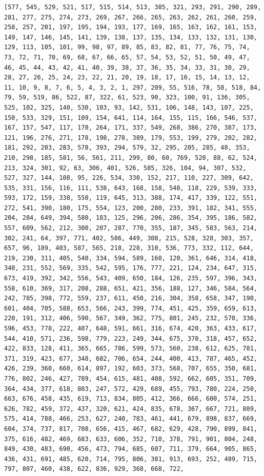 \documentclass{report}
\begin{document}
\begin{lstlisting}
[577, 545, 529, 521, 517, 515, 514, 513, 385, 321, 293, 291, 290, 289, 281, 277, 275, 274, 273, 269, 267, 266, 265, 263, 262, 261, 260, 259, 258, 257, 201, 197, 195, 194, 193, 177, 169, 165, 163, 162, 161, 153, 149, 147, 146, 145, 141, 139, 138, 137, 135, 134, 133, 132, 131, 130, 129, 113, 105, 101, 99, 98, 97, 89, 85, 83, 82, 81, 77, 76, 75, 74, 73, 72, 71, 70, 69, 68, 67, 66, 65, 57, 54, 53, 52, 51, 50, 49, 47, 46, 45, 44, 43, 42, 41, 40, 39, 38, 37, 36, 35, 34, 33, 31, 30, 29, 28, 27, 26, 25, 24, 23, 22, 21, 20, 19, 18, 17, 16, 15, 14, 13, 12, 11, 10, 9, 8, 7, 6, 5, 4, 3, 2, 1, 297, 209, 55, 516, 78, 58, 518, 84, 79, 59, 519, 86, 522, 87, 322, 61, 523, 90, 323, 100, 91, 136, 305, 525, 102, 325, 140, 530, 103, 93, 142, 531, 106, 148, 143, 107, 225, 150, 533, 329, 151, 109, 154, 641, 114, 164, 155, 115, 166, 546, 537, 167, 157, 547, 117, 170, 264, 171, 337, 549, 268, 386, 270, 387, 173, 121, 196, 276, 271, 178, 198, 278, 389, 179, 553, 199, 279, 202, 282, 181, 292, 203, 283, 578, 393, 294, 579, 32, 295, 205, 285, 48, 353, 210, 298, 185, 581, 56, 561, 211, 299, 80, 60, 769, 520, 88, 62, 524, 213, 324, 301, 92, 63, 306, 401, 526, 585, 326, 104, 94, 307, 532, 527, 327, 144, 108, 95, 226, 534, 330, 152, 217, 110, 227, 309, 642, 535, 331, 156, 116, 111, 538, 643, 168, 158, 548, 118, 229, 539, 333, 593, 172, 159, 338, 550, 119, 645, 313, 388, 174, 417, 339, 122, 551, 272, 541, 390, 180, 175, 554, 123, 200, 280, 233, 391, 182, 341, 555, 204, 284, 649, 394, 580, 183, 125, 296, 206, 286, 354, 395, 186, 582, 557, 609, 562, 212, 300, 207, 287, 770, 355, 187, 345, 583, 563, 214, 302, 241, 64, 397, 771, 402, 586, 449, 308, 215, 528, 328, 303, 357, 657, 96, 189, 403, 587, 565, 218, 228, 310, 536, 773, 332, 112, 644, 219, 230, 311, 405, 540, 334, 594, 589, 160, 120, 361, 646, 314, 418, 340, 231, 552, 569, 335, 542, 595, 176, 777, 221, 124, 234, 647, 315, 673, 419, 392, 342, 556, 543, 409, 650, 184, 126, 235, 597, 396, 343, 558, 610, 369, 317, 208, 288, 651, 421, 356, 188, 127, 346, 584, 564, 242, 785, 398, 772, 559, 237, 611, 450, 216, 304, 358, 658, 347, 190, 601, 404, 705, 588, 653, 566, 243, 399, 774, 451, 425, 359, 659, 613, 220, 191, 312, 406, 590, 567, 349, 362, 775, 801, 245, 232, 570, 336, 596, 453, 778, 222, 407, 648, 591, 661, 316, 674, 420, 363, 433, 617, 544, 410, 571, 236, 598, 779, 223, 249, 344, 675, 370, 318, 457, 652, 422, 833, 128, 411, 365, 665, 786, 599, 573, 560, 238, 612, 625, 781, 371, 319, 423, 677, 348, 602, 706, 654, 244, 400, 413, 787, 465, 452, 426, 239, 360, 660, 614, 897, 192, 603, 373, 568, 707, 655, 350, 681, 776, 802, 246, 427, 789, 454, 615, 481, 408, 592, 662, 605, 351, 709, 364, 434, 377, 618, 803, 247, 572, 429, 689, 455, 793, 780, 224, 250, 663, 676, 458, 435, 619, 713, 834, 805, 412, 366, 666, 600, 574, 251, 626, 782, 459, 372, 437, 320, 621, 424, 835, 678, 367, 667, 721, 809, 575, 414, 788, 466, 253, 627, 240, 783, 461, 441, 679, 898, 837, 669, 604, 374, 737, 817, 708, 656, 415, 467, 682, 629, 428, 790, 899, 841, 375, 616, 482, 469, 683, 633, 606, 352, 710, 378, 791, 901, 804, 248, 849, 430, 483, 690, 456, 473, 794, 685, 607, 711, 379, 664, 905, 865, 436, 431, 691, 485, 620, 714, 795, 806, 381, 913, 693, 252, 489, 715, 797, 807, 460, 438, 622, 836, 929, 368, 668, 722, 
\end{lstlisting}
\end{document}
